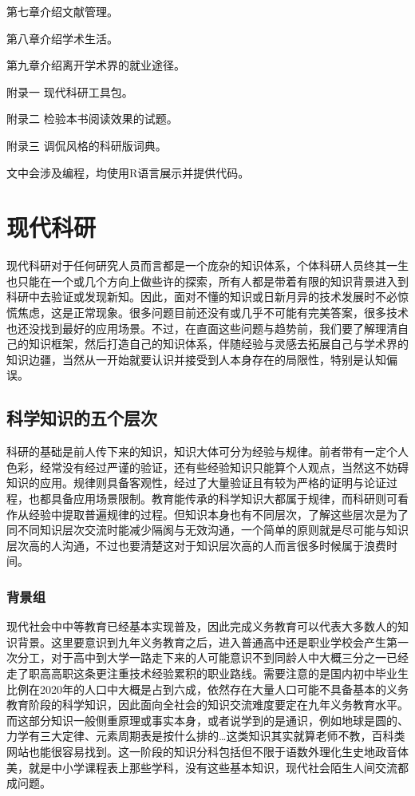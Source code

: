 \documentclass[]{tufte-book}
\begin{document}
第七章介绍文献管理。

第八章介绍学术生活。

第九章介绍离开学术界的就业途径。

附录一 现代科研工具包。

附录二 检验本书阅读效果的试题。

附录三 调侃风格的科研版词典。

文中会涉及编程，均使用R语言展示并提供代码。

\hypertarget{know}{%
\chapter{现代科研}\label{know}}

现代科研对于任何研究人员而言都是一个庞杂的知识体系，个体科研人员终其一生也只能在一个或几个方向上做些许的探索，所有人都是带着有限的知识背景进入到科研中去验证或发现新知。因此，面对不懂的知识或日新月异的技术发展时不必惊慌焦虑，这是正常现象。很多问题目前还没有或几乎不可能有完美答案，很多技术也还没找到最好的应用场景。不过，在直面这些问题与趋势前，我们要了解理清自己的知识框架，然后打造自己的知识体系，伴随经验与灵感去拓展自己与学术界的知识边疆，当然从一开始就要认识并接受到人本身存在的局限性，特别是认知偏误。

\hypertarget{ux79d1ux5b66ux77e5ux8bc6ux7684ux4e94ux4e2aux5c42ux6b21}{%
\section{科学知识的五个层次}\label{ux79d1ux5b66ux77e5ux8bc6ux7684ux4e94ux4e2aux5c42ux6b21}}

科研的基础是前人传下来的知识，知识大体可分为经验与规律。前者带有一定个人色彩，经常没有经过严谨的验证，还有些经验知识只能算个人观点，当然这不妨碍知识的应用。规律则具备客观性，经过了大量验证且有较为严格的证明与论证过程，也都具备应用场景限制。教育能传承的科学知识大都属于规律，而科研则可看作从经验中提取普遍规律的过程。但知识本身也有不同层次，了解这些层次是为了同不同知识层次交流时能减少隔阂与无效沟通，一个简单的原则就是尽可能与知识层次高的人沟通，不过也要清楚这对于知识层次高的人而言很多时候属于浪费时间。

\hypertarget{ux80ccux666fux7ec4}{%
\subsection{背景组}\label{ux80ccux666fux7ec4}}

现代社会中中等教育已经基本实现普及，因此完成义务教育可以代表大多数人的知识背景。这里要意识到九年义务教育之后，进入普通高中还是职业学校会产生第一次分工，对于高中到大学一路走下来的人可能意识不到同龄人中大概三分之一已经走了职高高职这条更注重技术经验累积的职业路线。需要注意的是国内初中毕业生比例在2020年的人口中大概是占到六成，依然存在大量人口可能不具备基本的义务教育阶段的科学知识，因此面向全社会的知识交流难度要定在九年义务教育水平。而这部分知识一般侧重原理或事实本身，或者说学到的是通识，例如地球是圆的、力学有三大定律、元素周期表是按什么排的\ldots 这类知识其实就算老师不教，百科类网站也能很容易找到。这一阶段的知识分科包括但不限于语数外理化生史地政音体美，就是中小学课程表上那些学科，没有这些基本知识，现代社会陌生人间交流都成问题。
\end{document}
